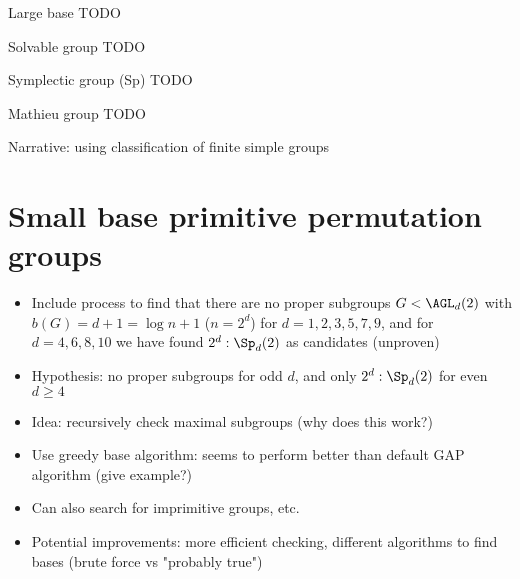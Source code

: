\begin{definition}
    Large base TODO
\end{definition}

\begin{definition}
    Solvable group TODO
\end{definition}

\begin{definition}
    Symplectic group (Sp) TODO
\end{definition}

\begin{definition}
    Mathieu group TODO
\end{definition}

Narrative: using classification of finite simple groups

\section{Small base primitive permutation groups}

\begin{itemize}
    \item Include process to find that there are no proper subgroups $G < \AGL_d(2)$ with $b(G) = d + 1 = \log n + 1$ ($n = 2^d$) for $d = 1,2,3,5,7,9$, and for $d = 4,6,8,10$ we have found $2^d : \Sp_d(2)$ as candidates (unproven)
    \item Hypothesis: no proper subgroups for odd $d$, and only $2^d : \Sp_d(2)$ for even $d \geq 4$
    \item Idea: recursively check maximal subgroups (why does this work?)
    \item Use greedy base algorithm: seems to perform better than default GAP algorithm (give example?)
    \item Can also search for imprimitive groups, etc.
    \item Potential improvements: more efficient checking, different algorithms to find bases (brute force vs "probably true")
\end{itemize}